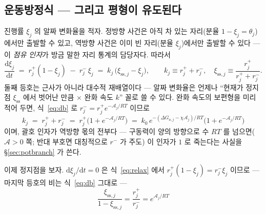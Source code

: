 \documentclass[11pt,a4paper]{article}
\newcommand{\dd}{\mathrm{d}}
\newcommand{\sstat}{\mathrm{ss}}
\begin{document}
\subsection{운동방정식 — 그리고 평형이 유도된다}
진행률 $\xi_j$ 의 알짜 변화율을 적자. 정방향 사건은 아직 차 있는 자리(분율 $1-\xi_j=\theta_j$)에서만
출발할 수 있고, 역방향 사건은 이미 빈 자리(분율 $\xi_j$)에서만 출발할 수 있다 — 이 \emph{점유 인자}가 방금 말한
자리 통계의 담당자다. 따라서
\begin{equation}
\frac{\dd\xi_j}{\dd t}\;=\;r_j^+(1-\xi_j)\;-\;r_j^-\,\xi_j
\;=\;k_j\,\big(\xi_{\sstat,j}-\xi_j\big),\qquad
k_j\equiv r_j^++r_j^-,\quad \xi_{\sstat,j}\equiv\frac{r_j^+}{r_j^++r_j^-}.
\label{eq:relax}
\end{equation}
둘째 등호는 근사가 아니라 대수적 재배열이다 — 알짜 변화율은 언제나 ``현재가 정지점 $\xi_{\sstat}$ 에서
벗어난 만큼 $\times$ 완화 속도 $k$'' 꼴로 쓸 수 있다. 완화 속도의 보편형을 미리 적어 두면, 식~\eqref{eq:db} 로 $r_j^-=r_j^+e^{-\mathcal A_j/RT}$
이므로
\begin{equation}
k_j\;=\;r_j^++r_j^-\;=\;r_j^+\big(1+e^{-\mathcal A_j/RT}\big)
\;=\;k_0\,e^{-(\Delta G_{a,j}-\chi\mathcal A_j)/RT}\big(1+e^{-\mathcal A_j/RT}\big)
\label{eq:kuniv}
\end{equation}
이며, 괄호 인자가 역방향 몫의 전부다 — 구동력이 양의 방향으로 수 $RT$ 를 넘으면($\mathcal A>0$
쪽; 반대 부호면 대칭적으로 $r^-$ 가 주도) 이 인자가 $1$ 로 죽는다는 사실을
\S\ref{sec:potbranch} 가 쓴다.

이제 정지점을 보자. $\dd\xi_j/\dd t=0$ 은 식~\eqref{eq:relax} 에서
$r_j^+(1-\xi_j)=r_j^-\xi_j$ 이므로 — 마지막 등호의 비는 식~\eqref{eq:db} 그대로 —
\begin{equation}
\frac{\xi_{\sstat,j}}{1-\xi_{\sstat,j}}=\frac{r_j^+}{r_j^-}=e^{\mathcal A_j/RT}
\label{eq:stationary}
\end{equation}
\end{document}
